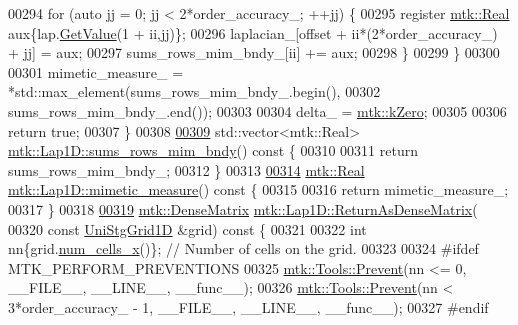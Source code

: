\begin{DoxyCode}
00294     \textcolor{keywordflow}{for} (\textcolor{keyword}{auto} jj = 0; jj < 2*order\_accuracy\_; ++jj) \{
00295       \textcolor{keyword}{register} \hyperlink{group__c01-roots_gac080bbbf5cbb5502c9f00405f894857d}{mtk::Real} aux\{lap.\hyperlink{classmtk_1_1DenseMatrix_a4b23ecbebd970b5eea915dbb50691024}{GetValue}(1 + ii,jj)\};
00296       laplacian\_[offset + ii*(2*order\_accuracy\_) + jj] = aux;
00297       sums\_rows\_mim\_bndy\_[ii] += aux;
00298     \}
00299   \}
00300 
00301     mimetic\_measure\_ = *std::max\_element(sums\_rows\_mim\_bndy\_.begin(),
00302                                       sums\_rows\_mim\_bndy\_.end());
00303 
00304   delta\_ = \hyperlink{group__c01-roots_ga59a451a5fae30d59649bcda274fea271}{mtk::kZero};
00305 
00306   \textcolor{keywordflow}{return} \textcolor{keyword}{true};
00307 \}
00308 
\hypertarget{mtk__lap__1d_8cc_source_l00309}{}\hyperlink{classmtk_1_1Lap1D_ad0f976d32700cd8b46aa99f5a8d9e38b}{00309} std::vector<mtk::Real> \hyperlink{classmtk_1_1Lap1D_ad0f976d32700cd8b46aa99f5a8d9e38b}{mtk::Lap1D::sums\_rows\_mim\_bndy}()\textcolor{keyword}{ const }\{
00310 
00311   \textcolor{keywordflow}{return} sums\_rows\_mim\_bndy\_;
00312 \}
00313 
\hypertarget{mtk__lap__1d_8cc_source_l00314}{}\hyperlink{classmtk_1_1Lap1D_a10a426657cccd1d6b25fbb58ed472d6f}{00314} \hyperlink{group__c01-roots_gac080bbbf5cbb5502c9f00405f894857d}{mtk::Real} \hyperlink{classmtk_1_1Lap1D_a10a426657cccd1d6b25fbb58ed472d6f}{mtk::Lap1D::mimetic\_measure}()\textcolor{keyword}{ const }\{
00315 
00316   \textcolor{keywordflow}{return} mimetic\_measure\_;
00317 \}
00318 
\hypertarget{mtk__lap__1d_8cc_source_l00319}{}\hyperlink{classmtk_1_1Lap1D_aaea34a17b0879e05eb4109645a2ba8f4}{00319} \hyperlink{classmtk_1_1DenseMatrix}{mtk::DenseMatrix} \hyperlink{classmtk_1_1Lap1D_aaea34a17b0879e05eb4109645a2ba8f4}{mtk::Lap1D::ReturnAsDenseMatrix}(
00320   \textcolor{keyword}{const} \hyperlink{classmtk_1_1UniStgGrid1D}{UniStgGrid1D} &grid)\textcolor{keyword}{ const }\{
00321 
00322   \textcolor{keywordtype}{int} nn\{grid.\hyperlink{classmtk_1_1UniStgGrid1D_af1b3729d8afa07be5b2775ed68015b80}{num\_cells\_x}()\};  \textcolor{comment}{// Number of cells on the grid.}
00323 
00324 \textcolor{preprocessor}{  #ifdef MTK\_PERFORM\_PREVENTIONS}
00325   \hyperlink{classmtk_1_1Tools_a332324c6f25e66be9dff48c5987a3b9f}{mtk::Tools::Prevent}(nn <= 0, \_\_FILE\_\_, \_\_LINE\_\_, \_\_func\_\_);
00326   \hyperlink{classmtk_1_1Tools_a332324c6f25e66be9dff48c5987a3b9f}{mtk::Tools::Prevent}(nn < 3*order\_accuracy\_ - 1, \_\_FILE\_\_, \_\_LINE\_\_, \_\_func\_\_);
00327 \textcolor{preprocessor}{  #endif}

\end{DoxyCode}
